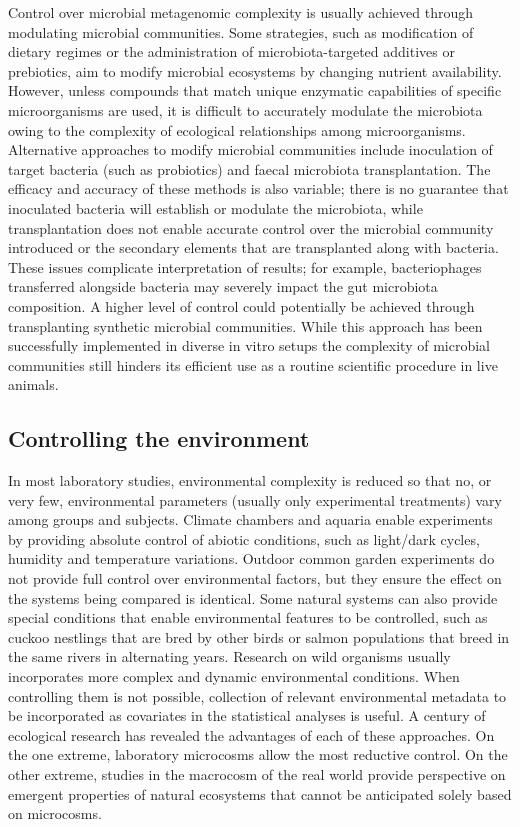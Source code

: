 \documentclass[
]{book}
\begin{document}
Control over microbial metagenomic complexity is usually achieved through modulating microbial communities. Some strategies, such as modification of dietary regimes or the administration of microbiota-targeted additives or prebiotics, aim to modify microbial ecosystems by changing nutrient availability. However, unless compounds that match unique enzymatic capabilities of specific microorganisms are used, it is difficult to accurately modulate the microbiota owing to the complexity of ecological relationships among microorganisms. Alternative approaches to modify microbial communities include inoculation of target bacteria (such as probiotics) and faecal microbiota transplantation. The efficacy and accuracy of these methods is also variable; there is no guarantee that inoculated bacteria will establish or modulate the microbiota, while transplantation does not enable accurate control over the microbial community introduced or the secondary elements that are transplanted along with bacteria. These issues complicate interpretation of results; for example, bacteriophages transferred alongside bacteria may severely impact the gut microbiota composition. A higher level of control could potentially be achieved through transplanting synthetic microbial communities. While this approach has been successfully implemented in diverse in vitro setups the complexity of microbial communities still hinders its efficient use as a routine scientific procedure in live animals.

\hypertarget{controlling-environment}{%
\subsection{Controlling the environment}\label{controlling-environment}}

In most laboratory studies, environmental complexity is reduced so that no, or very few, environmental parameters (usually only experimental treatments) vary among groups and subjects. Climate chambers and aquaria enable experiments by providing absolute control of abiotic conditions, such as light/dark cycles, humidity and temperature variations. Outdoor common garden experiments do not provide full control over environmental factors, but they ensure the effect on the systems being compared is identical. Some natural systems can also provide special conditions that enable environmental features to be controlled, such as cuckoo nestlings that are bred by other birds or salmon populations that breed in the same rivers in alternating years. Research on wild organisms usually incorporates more complex and dynamic environmental conditions. When controlling them is not possible, collection of relevant environmental metadata to be incorporated as covariates in the statistical analyses is useful. A century of ecological research has revealed the advantages of each of these approaches. On the one extreme, laboratory microcosms allow the most reductive control. On the other extreme, studies in the macrocosm of the real world provide perspective on emergent properties of natural ecosystems that cannot be anticipated solely based on microcosms.
\end{document}
